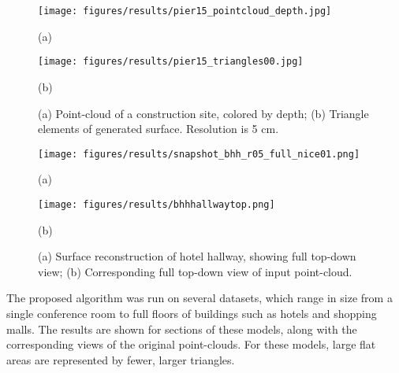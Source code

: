 \documentclass[10pt,twocolumn,letterpaper]{article}
\begin{document}
\begin{figure}[t]
	\centerline{\texttt{[image: figures/results/pier15\_pointcloud\_depth.jpg]}}
	\centerline{(a)}\medskip
	\centerline{\texttt{[image: figures/results/pier15\_triangles00.jpg]}}
	\centerline{(b)}
	\caption{(a) Point-cloud of a construction site, colored by depth; (b) Triangle elements of generated surface.  Resolution is 5 cm.}
	\label{fig:pier15}
\end{figure}

\begin{figure}[t]
	\begin{minipage}[b]{0.45\linewidth}
	\centerline{\texttt{[image: figures/results/snapshot\_bhh\_r05\_full\_nice01.png]}}
	\centerline{(a)}
	\end{minipage}
	\hfill
	\begin{minipage}[b]{0.45\linewidth}
	\centerline{\texttt{[image: figures/results/bhhhallwaytop.png]}}
	\centerline{(b)}
	\end{minipage}
	\caption{(a) Surface reconstruction of hotel hallway, showing full top-down view; (b) Corresponding full top-down view of input point-cloud.}
	\label{fig:bhh_hallway}
\end{figure}

The proposed algorithm was run on several datasets, which range in size from a single conference room to full floors of buildings such as hotels and shopping malls.  The results are shown for sections of these models, along with the corresponding views of the original point-clouds.  For these models, large flat areas are represented by fewer, larger triangles.
\end{document}
